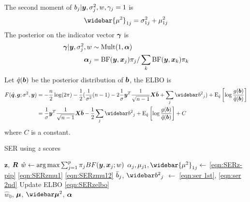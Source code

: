The second moment of $b_j | \bm y, \sigma^2_j, w, \gamma_j=1$ is \begin{equation}\label{eqn:SERzmu12}
    \widebar{\mu^2}_{1j} = \rv_{1j} + \mu_{1j}^2
\end{equation}
The posterior on the indicator vector $\bm \gamma$ is
\begin{align}
    \bm \gamma|\bm y, \sigma^2_j, w &\sim \text{Mult}(1,\bm \alpha) \\
    \bm \alpha_{j} &= \text{BF}(\bm y, \bm x_j) \pi_j/\sum_k \text{BF}(\bm y, \bm x_k) \pi_k \label{eqn:SERz-pip}
\end{align}
Let $\hat{q}(\bm b)$ be the posterior distribution of $\bm b$, the ELBO is
\begin{align}
    F(\hat{\q},\g;\rv, \vy) &= -\frac{n}{2} \log(2\pi) - \frac{1}{2}(\frac{1}{\rv}(n-1) - 2 \frac{1}{\sigma}\vy^T\frac{1}{\sqrt{n-1}}\mx \bar{\vb} + \sum_j \bbb_{j}) + \E_{\hat{q}}\left[\log\frac{g(\vb)}{\hat{q}(\vb)} \right] \\
    &= \frac{1}{\sigma}\vy^T\frac{1}{\sqrt{n-1}}\mx \bar{\vb} - \frac{1}{2} \sum_j \bbb_{j} + \E_{\hat{q}}\left[\log\frac{g(\vb)}{\hat{q}(\vb)}\right] + C\label{eqn:SERzelbo}
\end{align}
where $C$ is a constant.

\begin{algorithm}[H] 
\caption{SER using $z$ scores} \label{alg:SERzalg}
\begin{algorithmic}[1]
\Require $\bm{z}$, $\bm R$
\Repeat
\State $\hat{w} \gets \arg \max \sum_{j=1}^{p} \pi_j BF(\bm y, \bm x_j; w)$  
\State $\alpha_j, \mu_{j1}, \widebar{\mu^2}_{1j} \gets $ \eqref{eqn:SERz-pip} \eqref{eqn:SERzmu1} \eqref{eqn:SERzmu12} 
\State $\bar{b}_j$, $\bbb_j$ $\gets$ \eqref{eqn:ser 1st}, \eqref{eqn:ser 2nd} 
\State Update ELBO \eqref{eqn:SERzelbo}
 \\
\Return $\hat{w}_0$, $\bm \mu$, $\emusq$, $\bm \alpha$
\end{algorithmic}
\end{algorithm}

